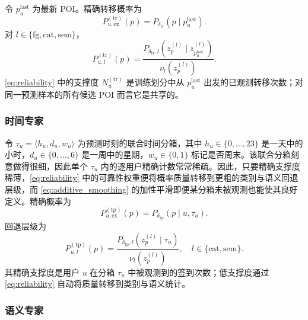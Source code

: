 \documentclass[10pt,fontset=none,twocolumn]{ctexart}
\begin{document}
令 $p_u^{\mathrm{last}}$ 为最新 POI。精确转移概率为
\begin{equation}
P_{u,\mathrm{ex}}^{(\mathrm{tr})}(p)
=
P_{\delta_{\mathrm{tr}}}(p\mid p_u^{\mathrm{last}}).
\label{eq:transition_exact}
\end{equation}
对 $l\in\{\mathrm{fg},\mathrm{cat},\mathrm{sem}\}$，
\begin{equation}
P_{u,l}^{(\mathrm{tr})}(p)
=
\frac{
P_{\delta_{\mathrm{tr}},l}
(z_p^{(l)}\mid z_{p_u^{\mathrm{last}}}^{(l)})
}{
\nu_l(z_p^{(l)})
}.
\label{eq:transition_backoff}
\end{equation}
\eqref{eq:reliability} 中的支撑度 $N_u^{(\mathrm{tr})}$ 是训练划分中从 $p_u^{\mathrm{last}}$ 出发的已观测转移次数；对同一预测样本的所有候选 POI 而言它是共享的。

\subsubsection{时间专家}

令 $\tau_u=\langle h_u,d_u,w_u\rangle$ 为预测时刻的联合时间分箱，其中 $h_u\in\{0,\ldots,23\}$ 是一天中的小时，$d_u\in\{0,\ldots,6\}$ 是一周中的星期，$w_u\in\{0,1\}$ 标记是否周末。该联合分箱刻意做得很细，因此单个 $\tau_u$ 内的逐用户精确计数常常稀疏。因此，只要精确支撑度稀薄，\eqref{eq:reliability} 中的可靠性权重便将概率质量转移到更粗的类别与语义回退层级，而 \eqref{eq:additive_smoothing} 的加性平滑即便某分箱未被观测也能使其良好定义。精确概率为
\begin{equation}
P_{u,\mathrm{ex}}^{(\mathrm{tp})}(p)
=
P_{\delta_{\mathrm{tp}}}(p\mid u,\tau_u).
\label{eq:temporal_exact}
\end{equation}
回退层级为
\begin{equation}
P_{u,l}^{(\mathrm{tp})}(p)
=
\frac{P_{\delta_{\mathrm{tp}},l}(z_p^{(l)}\mid\tau_u)}
{\nu_l(z_p^{(l)})},
\quad
l\in\{\mathrm{cat},\mathrm{sem}\}.
\label{eq:temporal_backoff}
\end{equation}
其精确支撑度是用户 $u$ 在分箱 $\tau_u$ 中被观测到的签到次数；低支撑度通过 \eqref{eq:reliability} 自动将质量转移到类别与语义统计。

\subsubsection{语义专家}
\end{document}
